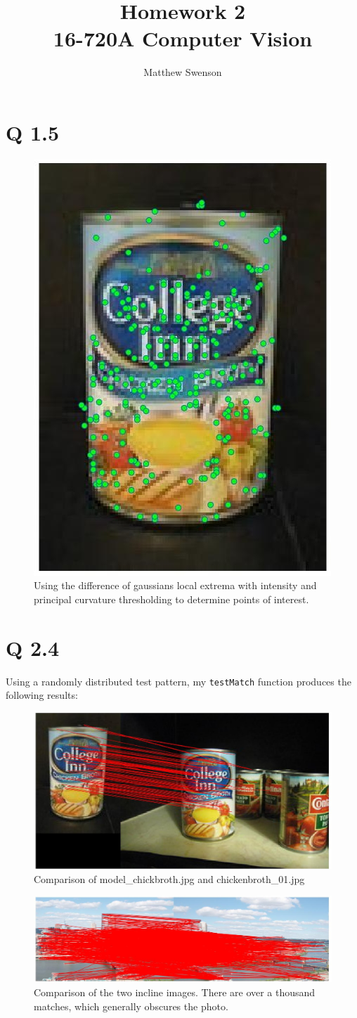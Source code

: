 \documentclass[11pt]{article}
\title{Homework 2\\ \vspace{2mm}\Large{16-720A Computer Vision }}
\author{Matthew Swenson}
\begin{document}
	\maketitle
	
\section*{Q 1.5}
\begin{figure}[H]
\centering
\includegraphics[width=.5\textwidth]{results/keypoints.jpg}
\caption{Using the difference of gaussians local extrema with intensity and principal 
curvature thresholding to determine points of interest. }
\end{figure}
\section*{Q 2.4}
Using a randomly distributed test pattern, my \texttt{testMatch} function produces the following 
results:
\begin{figure}[H]
\centering
\includegraphics[width=.5\textwidth]{results/BRIEF_chickenbroth.jpg}
\caption{Comparison of model\_chickbroth.jpg and chickenbroth\_01.jpg}
\end{figure}
\begin{figure}[H]
\centering
\includegraphics[width=\textwidth]{results/BRIEF_incline.jpg}
\caption{Comparison of the two incline images. There are over a thousand
matches, which generally obscures the photo. }
\end{figure}
\end{document}

